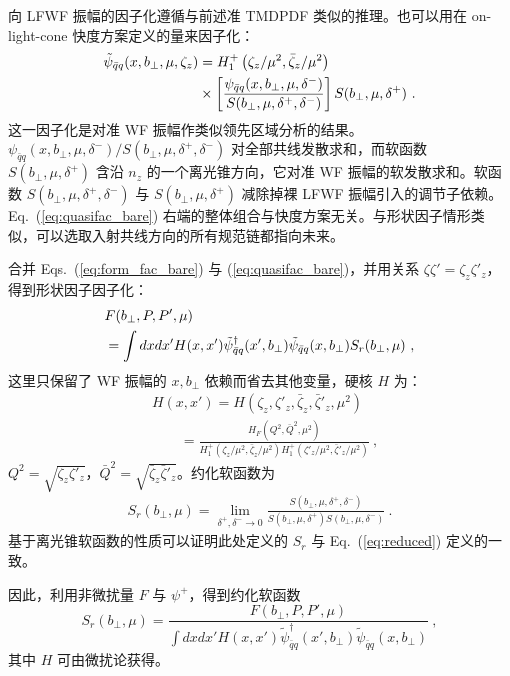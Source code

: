 向 LFWF 振幅的因子化遵循与前述准 TMDPDF 类似的推理。也可以用在 on-light-cone 快度方案定义的量来因子化：
\begin{align}\label{eq:quasifac_bare}
	\tilde \psi_{\bar q q}(x,b_\perp,\mu,\zeta_z)&=H^+_1\left(\zeta_z/\mu^2,\bar \zeta_z/\mu^2\right)\\ &\times \left[\frac{\psi_{\bar q q}(x,b_\perp,\mu,\delta^-)}{S(b_\perp,\mu,\delta^+,\delta^-)}\right]S(b_\perp,\mu,\delta^+) \ . \nonumber
\end{align}
这一因子化是对准 WF 振幅作类似领先区域分析的结果。$\psi_{\bar q q}(x,b_\perp,\mu,\delta^-)/S(b_\perp,\mu,\delta^+,\delta^-)$ 对全部共线发散求和，而软函数 $S(b_\perp,\mu,\delta^+)$ 含沿 ${n_z}$ 的一个离光锥方向，它对准 WF 振幅的软发散求和。软函数 $S(b_\perp,\mu,\delta^+,\delta^-)$ 与 $S(b_\perp,\mu,\delta^+)$ 减除掉裸 LFWF 振幅引入的调节子依赖。Eq.~(\ref{eq:quasifac_bare}) 右端的整体组合与快度方案无关。与形状因子情形类似，可以选取入射共线方向的所有规范链都指向未来。

合并 Eqs.~(\ref{eq:form_fac_bare}) 与 (\ref{eq:quasifac_bare})，并用关系 $\zeta \zeta'= \zeta_z \zeta'_z$，得到形状因子因子化：
\begin{align}
	& F(b_\perp,P,P',\mu)\\
	&= \int dx dx' H(x,x')\tilde \psi_{\bar q q}^{\dagger}(x',b_\perp)\tilde \psi_{\bar q q}(x,b_\perp)S_{r}(b_\perp,\mu)\ ,\nonumber
\end{align}
这里只保留了 WF 振幅的 $x,b_\perp$ 依赖而省去其他变量，硬核 $H$ 为：
\begin{align}
	&H(x,x')=H(\zeta_z,\zeta'_z,\bar \zeta_z,\bar \zeta'_z,\mu^2)\nonumber \\
	&\qquad=\frac{H_F(Q^2,\bar Q^2,\mu^2)}{H^+_1\left(\zeta_z/\mu^2,\bar \zeta_z/\mu^2\right)H^+_1\left(\zeta'_z/\mu^2,\bar \zeta'_z/\mu^2\right)} \ ,
\end{align}
$Q^2=\sqrt{\zeta_z\zeta'_z}$，$\bar Q^2=\sqrt{\bar \zeta_z\bar\zeta'_z}$。约化软函数为
\begin{align}
	S_{r}(b_\perp,\mu)=\lim_{\delta^+,\delta^-\rightarrow 0}\frac{S(b_\perp,\mu,\delta^+,\delta^-)}{S(b_\perp,\mu,\delta^+)S(b_\perp,\mu,\delta^-)} \ .
\end{align}
基于离光锥软函数的性质可以证明此处定义的 $S_r$ 与 Eq.~(\ref{eq:reduced}) 定义的一致。

因此，利用非微扰量 $F$ 与 $\psi^+$，得到约化软函数
\begin{equation}
	S_{r}(b_\perp,\mu)=\frac{F(b_\perp,P,P',\mu)}{\int dx dx' H(x,x')\tilde \psi_{\bar q q}^{\dagger}(x',b_\perp)\tilde \psi_{\bar q q}(x,b_\perp)} \ ,
	\label{eq:form_qfac}
\end{equation}
其中 $H$ 可由微扰论获得。

